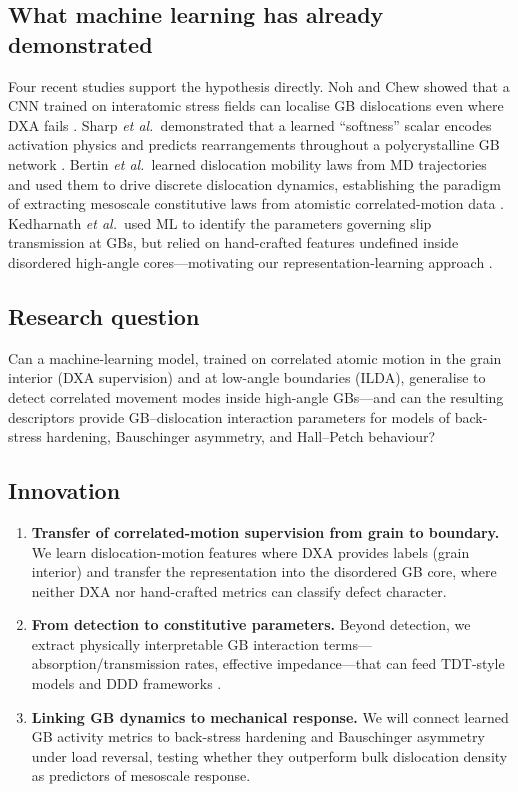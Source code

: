 \documentclass[11pt]{article}
\begin{document}
\subsection*{What machine learning has already demonstrated}
Four recent studies support the hypothesis directly.
Noh and Chew showed that a CNN trained on interatomic stress fields can localise GB dislocations even where DXA fails \cite{Noh2024}.
Sharp \emph{et al.}\ demonstrated that a learned ``softness'' scalar encodes activation physics and predicts rearrangements throughout a polycrystalline GB network \cite{Sharp2018}.
Bertin \emph{et al.}\ learned dislocation mobility laws from MD trajectories and used them to drive discrete dislocation dynamics, establishing the paradigm of extracting mesoscale constitutive laws from atomistic correlated-motion data \cite{Bertin2024}.
Kedharnath \emph{et al.}\ used ML to identify the parameters governing slip transmission at GBs, but relied on hand-crafted features undefined inside disordered high-angle cores---motivating our representation-learning approach \cite{Kedharnath2024}.

\subsection*{Research question}
Can a machine-learning model, trained on correlated atomic motion in the grain interior (DXA supervision) and at low-angle boundaries (ILDA), generalise to detect correlated movement modes inside high-angle GBs---and can the resulting descriptors provide GB--dislocation interaction parameters for models of back-stress hardening, Bauschinger asymmetry, and Hall--Petch behaviour?

\subsection*{Innovation}

\begin{enumerate}[leftmargin=*]
\item \textbf{Transfer of correlated-motion supervision from grain to boundary.}
We learn dislocation-motion features where DXA provides labels (grain interior) and transfer the representation into the disordered GB core, where neither DXA \cite{OVITODXA} nor hand-crafted metrics \cite{Firman2024} can classify defect character.

\item \textbf{From detection to constitutive parameters.}
Beyond detection, we extract physically interpretable GB interaction terms---absorption/transmission rates, effective impedance---that can feed TDT-style models \cite{Piao2022,LeBauschinger2018} and DDD frameworks \cite{Bertin2024}.

\item \textbf{Linking GB dynamics to mechanical response.}
We will connect learned GB activity metrics to back-stress hardening and Bauschinger asymmetry under load reversal, testing whether they outperform bulk dislocation density as predictors of mesoscale response.
\end{enumerate}
\end{document}
